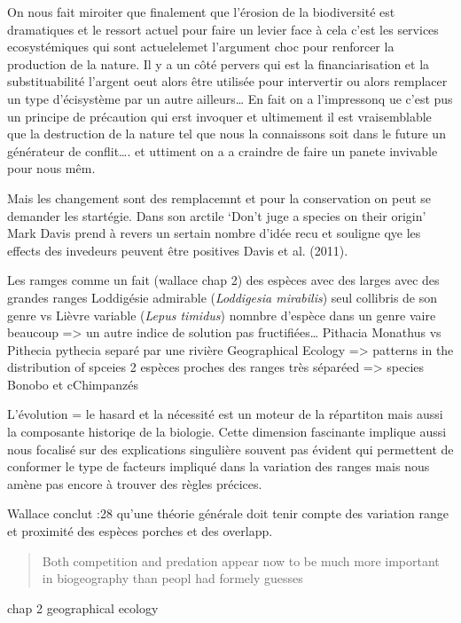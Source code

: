 On nous fait miroiter que finalement que l'érosion de la biodiversité
est dramatiques et le ressort actuel pour faire un levier face à cela
c'est les services ecosystémiques qui sont actuelelemet l'argument choc
pour renforcer la production de la nature. Il y a un côté pervers qui
est la financiarisation et la substituabilité l'argent oeut alors être
utilisée pour intervertir ou alors remplacer un type d'écisystème par un
autre ailleurs\ldots{} En fait on a l'impressonq ue c'est pus un
principe de précaution qui erst invoquer et ultimement il est
vraisemblable que la destruction de la nature tel que nous la
connaissons soit dans le future un générateur de conflit\ldots{}. et
uttiment on a a craindre de faire un panete invivable pour nous mêm.

Mais les changement sont des remplacemnt et pour la conservation on peut
se demander les startégie. Dans son arctile `Don't juge a species on
their origin' Mark Davis prend à revers un sertain nombre d'idée recu et
souligne qye les effects des invedeurs peuvent être positives Davis et
al. (2011).

Les ramges comme un fait (wallace chap 2) des espèces avec des larges
avec des grandes ranges Loddigésie admirable (\emph{Loddigesia
mirabilis}) seul collibris de son genre vs Lièvre variable (\emph{Lepus
timidus}) nomnbre d'espèce dans un genre vaire beaucoup =\textgreater{}
un autre indice de solution pas fructifiées\ldots{} Pithacia Monathus vs
Pithecia pythecia separé par une rivière Geographical Ecology
=\textgreater{} patterns in the distribution of spceies 2 espèces
proches des ranges très séparéed =\textgreater{} species Bonobo et
cChimpanzés

L'évolution = le hasard et la nécessité est un moteur de la répartiton
mais aussi la composante historiqe de la biologie. Cette dimension
fascinante implique aussi nous focalisé sur des explications singulière
souvent pas évident qui permettent de conformer le type de facteurs
impliqué dans la variation des ranges mais nous amène pas encore à
trouver des règles précices.

Wallace conclut :28 qu'une théorie générale doit tenir compte des
variation range et proximité des espèces porches et des overlapp.

\begin{quote}
Both competition and predation appear now to be much more important in
biogeography than peopl had formely guesses
\end{quote}

chap 2 geographical ecology

